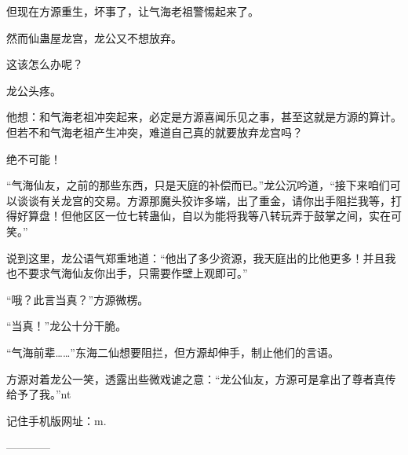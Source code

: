 \begin{this_body}
但现在方源重生，坏事了，让气海老祖警惕起来了。

然而仙蛊屋龙宫，龙公又不想放弃。

这该怎么办呢？

龙公头疼。

他想：和气海老祖冲突起来，必定是方源喜闻乐见之事，甚至这就是方源的算计。但若不和气海老祖产生冲突，难道自己真的就要放弃龙宫吗？

绝不可能！

“气海仙友，之前的那些东西，只是天庭的补偿而已。”龙公沉吟道，“接下来咱们可以谈谈有关龙宫的交易。方源那魔头狡诈多端，出了重金，请你出手阻拦我等，打得好算盘！但他区区一位七转蛊仙，自以为能将我等八转玩弄于鼓掌之间，实在可笑。”

说到这里，龙公语气郑重地道：“他出了多少资源，我天庭出的比他更多！并且我也不要求气海仙友你出手，只需要作壁上观即可。”

“哦？此言当真？”方源微楞。

“当真！”龙公十分干脆。

“气海前辈……”东海二仙想要阻拦，但方源却伸手，制止他们的言语。

方源对着龙公一笑，透露出些微戏谑之意：“龙公仙友，方源可是拿出了尊者真传给予了我。”nt

记住手机版网址：m.

------------

\end{this_body}

